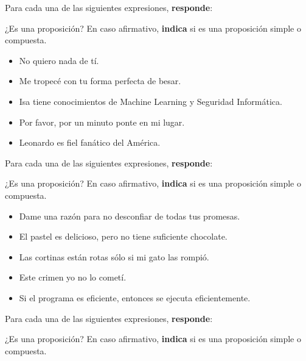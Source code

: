 \documentclass[oneside]{style}
\begin{document}
\begin{questions}[label=\protect\circled{\bfseries\arabic*}]
    \question
    {
        Para cada una de las siguientes expresiones, \textbf{responde}:
        \begin{center}
            ¿Es una proposición? En caso afirmativo, \textbf{indica} si 
            es una proposición simple o compuesta. 
        \end{center}

        \begin{itemize}
            \item No quiero nada de tí. 
            \item Me tropecé con tu forma perfecta de besar. 
            \item Isa tiene conocimientos de Machine Learning y Seguridad 
            Informática. 
            \item Por favor, por un minuto ponte en mi lugar. 
            \item Leonardo es fiel fanático del América. 
        \end{itemize}
    }

    \question
    {
        Para cada una de las siguientes expresiones, \textbf{responde}:
        \begin{center}
            ¿Es una proposición? En caso afirmativo, \textbf{indica} si 
            es una proposición simple o compuesta. 
        \end{center}

        \begin{itemize}
            \item Dame una razón para no desconfiar de todas tus promesas. 
            \item El pastel es delicioso, pero no tiene suficiente chocolate. 
            \item Las cortinas están rotas sólo si mi gato las rompió. 
            \item Este crimen yo no lo cometí. 
            \item Si el programa es eficiente, entonces se ejecuta eficientemente.
        \end{itemize}
    }

    \question
    {
        Para cada una de las siguientes expresiones, \textbf{responde}:
        \begin{center}
            ¿Es una proposición? En caso afirmativo, \textbf{indica} si 
            es una proposición simple o compuesta. 
        \end{center}

}
\end{questions}
\end{document}

